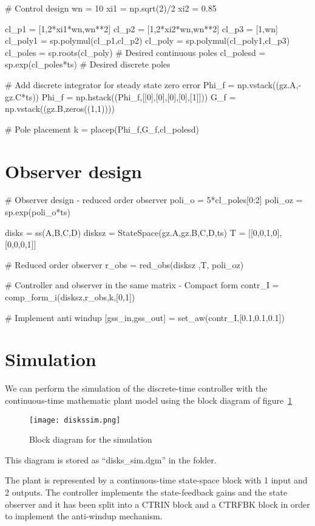 \begin{code}
# Control design
wn = 10
xi1 = np.sqrt(2)/2 
xi2 = 0.85 

cl_p1 = [1,2*xi1*wn,wn**2]
cl_p2 = [1,2*xi2*wn,wn**2]
cl_p3 = [1,wn]
cl_poly1 = sp.polymul(cl_p1,cl_p2)
cl_poly = sp.polymul(cl_poly1,cl_p3)
cl_poles = sp.roots(cl_poly)     # Desired continuous poles
cl_polesd = sp.exp(cl_poles*ts)  # Desired discrete poles

# Add discrete integrator for steady state zero error
Phi_f = np.vstack((gz.A,-gz.C*ts))
Phi_f = np.hstack((Phi_f,[[0],[0],[0],[0],[1]]))
G_f = np.vstack((gz.B,zeros((1,1))))

# Pole placement
k = placep(Phi_f,G_f,cl_polesd)
\end{code}

\section{Observer design}
\begin{code}
# Observer design - reduced order observer
poli_o = 5*cl_poles[0:2]
poli_oz = sp.exp(poli_o*ts) 

disks = ss(A,B,C,D)
disksz = StateSpace(gz.A,gz.B,C,D,ts)
T = [[0,0,1,0],[0,0,0,1]]

# Reduced order observer
r_obs = red_obs(disksz ,T, poli_oz)

# Controller and observer in the same matrix -  Compact form
contr_I = comp_form_i(disksz,r_obs,k,[0,1])

# Implement anti windup
[gss_in,gss_out] = set_aw(contr_I,[0.1,0.1,0.1])
\end{code}

\section{Simulation}

We can perform the simulation of the discrete-time controller with the 
continuous-time mathematic plant model using the block diagram of 
figure~\ref{F21}

\begin{figure}[htbp]	%
\centering
\texttt{[image: diskssim.png]}
\caption{Block diagram for the simulation}
\label{F21}
\end{figure}

This diagram is stored as ``disks\_sim.dgm'' in the folder.

The plant is represented by a continuous-time state-space block with 1 input 
and 2 outputs.
The controller implements the state-feedback gains and the state observer 
and it has been split into a CTRIN block and a CTRFBK block in order to 
implement the anti-windup mechanism.

